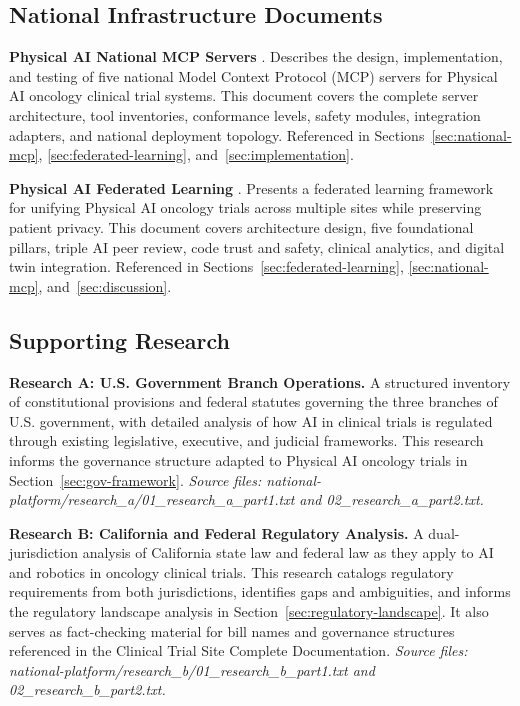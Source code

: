 \subsection*{National Infrastructure Documents}

\noindent\textbf{Physical AI National MCP Servers} \cite{national-mcp-paper}.
Describes the design, implementation, and testing of five national Model Context
Protocol (MCP) servers for Physical AI oncology clinical trial systems. This
document covers the complete server architecture, tool inventories, conformance
levels, safety modules, integration adapters, and national deployment topology.
Referenced in Sections~\ref{sec:national-mcp},
\ref{sec:federated-learning}, and~\ref{sec:implementation}.

\vspace{0.3cm}
\noindent\textbf{Physical AI Federated Learning} \cite{fl-paper}.
Presents a federated learning framework for unifying Physical AI oncology trials
across multiple sites while preserving patient privacy. This document covers
architecture design, five foundational pillars, triple AI peer review,
code trust and safety, clinical analytics, and digital twin integration.
Referenced in Sections~\ref{sec:federated-learning}, \ref{sec:national-mcp},
and~\ref{sec:discussion}.

\subsection*{Supporting Research}

\noindent\textbf{Research A: U.S. Government Branch Operations.}
A structured inventory of constitutional provisions and federal statutes
governing the three branches of U.S. government, with detailed analysis of how
AI in clinical trials is regulated through existing legislative, executive, and
judicial frameworks. This research informs the governance structure adapted to
Physical AI oncology trials in Section~\ref{sec:gov-framework}.
\textit{Source files: national-platform/research\_a/01\_research\_a\_part1.txt
and 02\_research\_a\_part2.txt.}

\vspace{0.3cm}
\noindent\textbf{Research B: California and Federal Regulatory Analysis.}
A dual-jurisdiction analysis of California state law and federal law as they
apply to AI and robotics in oncology clinical trials. This research catalogs
regulatory requirements from both jurisdictions, identifies gaps and
ambiguities, and informs the regulatory landscape analysis in
Section~\ref{sec:regulatory-landscape}. It also serves as fact-checking
material for bill names and governance structures referenced in the Clinical
Trial Site Complete Documentation.
\textit{Source files: national-platform/research\_b/01\_research\_b\_part1.txt
and 02\_research\_b\_part2.txt.}

